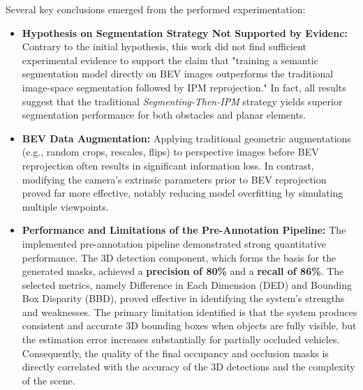 Several key conclusions emerged from the performed experimentation:
\begin{itemize}
    \item \textbf{Hypothesis on Segmentation Strategy Not Supported by Evidenc:} Contrary to the initial hypothesis, this work did not find sufficient experimental evidence to support the claim that "training a semantic segmentation model directly on BEV images outperforms the traditional image-space segmentation followed by IPM reprojection." In fact, all results suggest that the traditional \textit{Segmenting-Then-IPM} strategy yields superior segmentation performance for both obstacles and planar elements.
    \item \textbf{BEV Data Augmentation:} Applying traditional geometric augmentations (e.g., random crops, rescales, flips) to perspective images before BEV reprojection often results in significant information loss. In contrast, modifying the camera's extrinsic parameters prior to BEV reprojection proved far more effective, notably reducing model overfitting by simulating multiple viewpoints.
    \item \textbf{Performance and Limitations of the Pre-Annotation Pipeline:} The implemented pre-annotation pipeline demonstrated strong quantitative performance. The 3D detection component, which forms the basis for the generated masks, achieved a \textbf{precision of 80\%} and a \textbf{recall of 86\%}. The selected metrics, namely Difference in Each Dimension (DED) and Bounding Box Disparity (BBD), proved effective in identifying the system's strengths and weaknesses.
    The primary limitation identified is that the system produces consistent and accurate 3D bounding boxes when objects are fully visible, but the estimation error increases substantially for partially occluded vehicles. Consequently, the quality of the final occupancy and occlusion masks is directly correlated with the accuracy of the 3D detections and the complexity of the scene.
\end{itemize}

